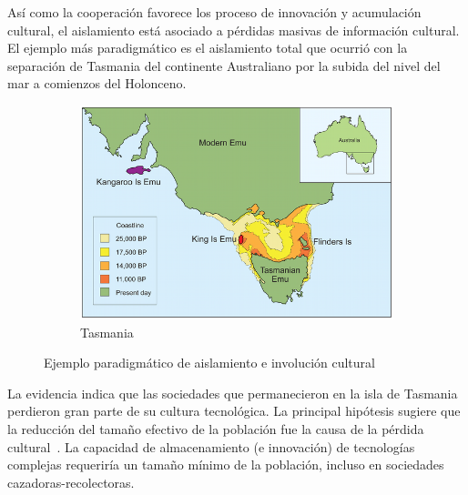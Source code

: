 \documentclass[a4paper,11pt]{book}
\theoremstyle{definition}
\begin{document}
Así como la cooperación favorece los proceso de innovación y acumulación cultural, el aislamiento está asociado a pérdidas masivas de información cultural.
%
El ejemplo más paradigmático es el aislamiento total que ocurrió con la separación de Tasmania del continente Australiano por la subida del nivel del mar a comienzos del Holonceno.
%
\begin{figure}[ht!]
  \centering
  \begin{subfigure}[c]{0.42\textwidth}
    \includegraphics[width=\textwidth]{static/tasmania.png}
    \caption{Tasmania}
    \label{fig:tasmania}
  \end{subfigure}
  \caption{Ejemplo paradigmático de aislamiento e involución cultural}
  \label{fig:aislamiento}
\end{figure}
La evidencia indica que las sociedades que permanecieron en la isla de Tasmania perdieron gran parte de su cultura tecnológica.
%
La principal hipótesis sugiere que la reducción del tama\~no efectivo de la población fue la causa de la pérdida cultural~\cite{Henrich2004}.
%
La capacidad de almacenamiento (e innovación) de tecnologías complejas requeriría un tama\~no mínimo de la población, incluso en sociedades cazadoras-recolectoras.

\end{document}
